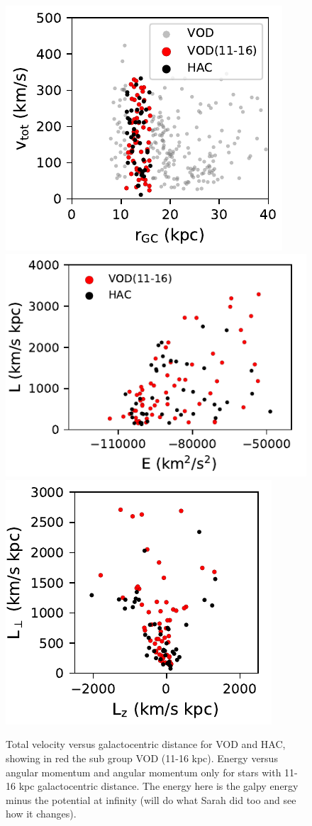 \documentclass[fleqn,usenatbib]{mnras}
\begin{document}
   \begin{figure}
	\includegraphics[scale=0.398]{vtot_r.pdf}
        \includegraphics[scale=0.398]{E_L.pdf}
        \includegraphics[scale=0.398]{Lz_Lp.pdf}
		       	       	       	       \vspace{-0.4cm}
   \caption{Total velocity versus galactocentric distance for VOD and
     HAC, showing in red the sub group VOD (11-16 kpc). Energy versus
     angular momentum and angular momentum only for stars with 11-16
     kpc galactocentric distance. The energy here is the galpy energy
     minus the potential at infinity (will do what Sarah did too and
     see how it changes).}
    \label{fig:energy}
\end{figure}
%
   
\end{document}
